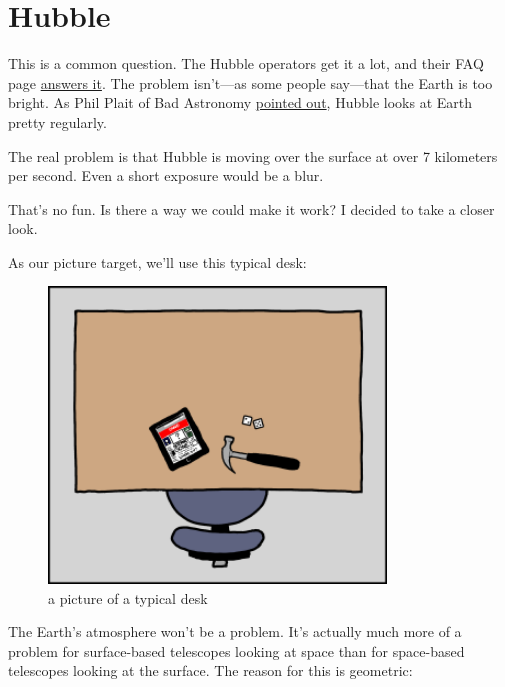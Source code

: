 {
\chapter{Hubble}
}

\hfill{}

{This is a common question. The Hubble operators get it a lot, and their FAQ page \href{http://hubblesite.org/reference\_desk/faq/answer.php.id=78&cat=topten}{answers it}. The problem isn’t—as some people say—that the Earth is too bright. As Phil Plait of Bad Astronomy \href{http://www.badastronomy.com/mad/2000/hubbleearth.html} {pointed out}, Hubble looks at Earth pretty regularly.}

{The real problem is that Hubble is moving over the surface at over 7 kilometers per second. Even a short exposure would be a blur.}

{That’s no fun. Is there a way we could make it work? I decided to take a closer look.}

{As our picture target, we’ll use this typical desk:}

\begin{figure}[!htbp]
\centering
\includegraphics[scale=0.5, max width=0.8\textwidth]{imgs/a/32/hubble_normal.png}
\caption{a picture of a typical desk}
\end{figure}

{The Earth’s atmosphere won’t be a problem. It’s actually much more of a problem for surface-based telescopes looking at space than for space-based telescopes looking at the surface. The reason for this is geometric:}

